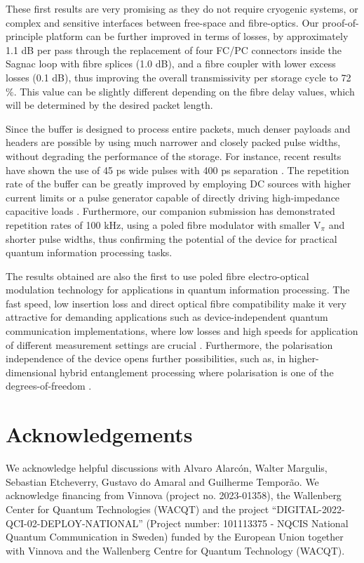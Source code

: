 \documentclass[%
reprint,
superscriptaddress,
 amsmath,amssymb,
 aps,
 prx,
floatfix,
]{revtex4-2}
\begin{document}
These first results are very promising as they do not require cryogenic systems, or complex and sensitive interfaces between free-space and fibre-optics. Our proof-of-principle platform can be further improved in terms of losses, by approximately 1.1 dB per pass through the replacement of four FC/PC connectors inside the Sagnac loop with fibre splices (1.0 dB), and a fibre coupler with lower excess losses (0.1 dB), thus improving the overall transmissivity per storage cycle to 72$\%$. This value can be slightly different depending on the fibre delay values, which will be determined by the desired packet length. 

Since the buffer is designed to process entire packets, much denser payloads and headers are possible by using much narrower and closely packed pulse widths, without degrading the performance of the storage. For instance, recent results have shown the use of 45 ps wide pulses with 400 ps separation \cite{Grunenfelder2023}. The repetition rate of the buffer can be greatly improved by employing DC sources with higher current limits or a pulse generator capable of directly driving  high-impedance capacitive loads \cite{Xu2017}. Furthermore, our companion submission \cite{Guerrero2026} has demonstrated repetition rates of 100 kHz, using a poled fibre modulator with smaller V$_\pi$ and shorter pulse widths, thus confirming the potential of the device for practical quantum information processing tasks.

The results obtained are also the first to use poled fibre electro-optical modulation technology for applications in quantum information processing. The fast speed, low insertion loss and direct optical fibre compatibility make it very attractive for demanding applications such as device-independent quantum communication implementations, where low losses and high speeds for application of different measurement settings are crucial \cite{Xavier2025}. Furthermore, the polarisation independence of the device opens further possibilities, such as, in higher-dimensional hybrid entanglement processing where polarisation is one of the degrees-of-freedom \cite{Zhong2024}.



\section*{Acknowledgements}
We acknowledge helpful discussions with Alvaro Alarcón, Walter Margulis, Sebastian Etcheverry, Gustavo do Amaral and Guilherme Tempor\~ao. We acknowledge financing from Vinnova (project no. 2023-01358), the Wallenberg Center for Quantum Technologies (WACQT) and the project “DIGITAL-2022-QCI-02-DEPLOY-NATIONAL” (Project number: 101113375 - NQCIS National Quantum Communication in Sweden) funded by the European Union together with Vinnova and the Wallenberg Centre for Quantum Technology (WACQT).





% 

\clearpage

\end{document}
